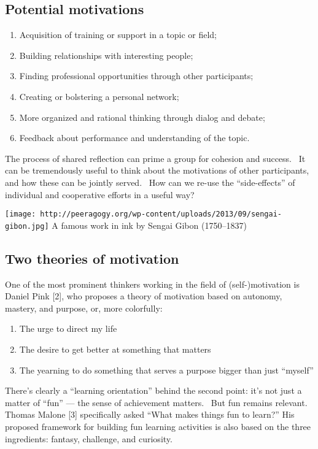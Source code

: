 \subsection{Potential motivations}

\begin{enumerate}
\itemsep1pt\parskip0pt
\item
  Acquisition of training or support in a topic or field;
\item
  Building relationships with interesting people;
\item
  Finding professional opportunities through other participants;
\item
  Creating or bolstering a personal network;
\item
  More organized and rational thinking through dialog and debate;
\item
  Feedback about performance and understanding of the topic.
\end{enumerate}

The process of shared reflection can prime a group for cohesion and
success.~ It can be tremendously useful to think about the motivations
of other participants, and how these can be jointly served.~ How can we
re-use the ``side-effects'' of individual and cooperative efforts in a
useful way?

\texttt{[image: http://peeragogy.org/wp-content/uploads/2013/09/sengai-gibon.jpg]}
A famous work in ink by Sengai Gibon (1750--1837)

\subsection{Two theories of motivation}

One of the most prominent thinkers working in the field of
\mbox{(self-)}motivation is Daniel Pink {[}2{]}, who proposes a theory of
motivation based on autonomy, mastery, and purpose, or, more colorfully:

\begin{enumerate}
\itemsep1pt\parskip0pt
\item
  The urge to direct my life
\item
  The desire to get better at something that matters
\item
  The yearning to do something that serves a purpose bigger than just
  ``myself''
\end{enumerate}

There's clearly a ``learning orientation'' behind the second point: it's
not just a matter of ``fun'' --- the sense of achievement matters.~ But
fun remains relevant. Thomas Malone {[}3{]} specifically asked ``What
makes things fun to learn?'' His proposed framework for building fun
learning activities is also based on the three ingredients: fantasy,
challenge, and curiosity.

